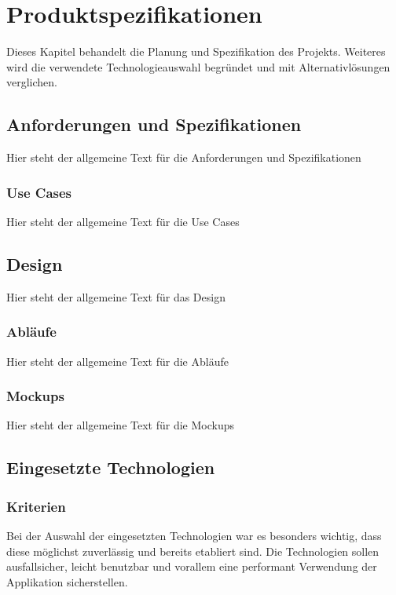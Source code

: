 \chapter{Produktspezifikationen}
Dieses Kapitel behandelt die Planung und Spezifikation des Projekts.
Weiteres wird die verwendete Technologieauswahl begründet und mit Alternativlösungen verglichen.

\section{Anforderungen und Spezifikationen}
Hier steht der allgemeine Text für die Anforderungen und Spezifikationen

\subsection{Use Cases}
Hier steht der allgemeine Text für die Use Cases

\section{Design}
Hier steht der allgemeine Text für das Design

\subsection{Abläufe}
Hier steht der allgemeine Text für die Abläufe

\subsection{Mockups}
Hier steht der allgemeine Text für die Mockups

\section{Eingesetzte Technologien}

\subsection{Kriterien}
Bei der Auswahl der eingesetzten Technologien war es besonders wichtig, dass diese möglichst
zuverlässig und bereits etabliert sind. Die Technologien sollen ausfallsicher, leicht benutzbar
und vorallem eine performant Verwendung der Applikation sicherstellen.

